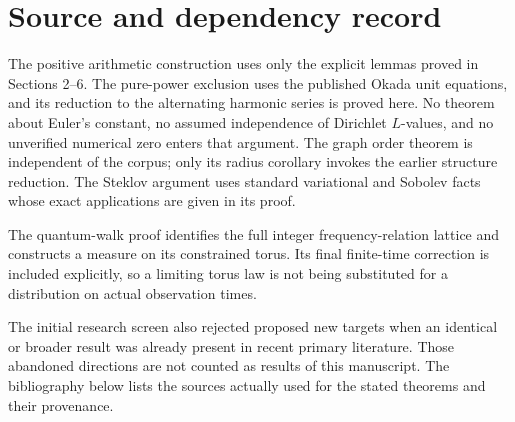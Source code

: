 \documentclass[11pt,a4paper]{article}
\theoremstyle{definition}\newtheorem{definition}[theorem]{Definition}
\theoremstyle{remark}\newtheorem{remark}[theorem]{Remark}
\begin{document}
\section{Source and dependency record}
The positive arithmetic construction uses only the explicit lemmas proved
in Sections 2--6. The pure-power exclusion uses the published Okada unit
equations, and its reduction to the alternating harmonic series is proved
here. No theorem about Euler's constant, no assumed independence of
Dirichlet $L$-values, and no unverified numerical zero enters that argument.
The graph order theorem is independent of the corpus; only its radius
corollary invokes the earlier structure reduction. The Steklov argument
uses standard variational and Sobolev facts whose exact applications
are given in its proof.

The quantum-walk proof identifies the full integer frequency-relation
lattice and constructs a measure on its constrained torus. Its final
finite-time correction is included explicitly, so a limiting torus law
is not being substituted for a distribution on actual observation times.

The initial research screen also rejected proposed new targets when an
identical or broader result was already present in recent primary
literature. Those abandoned directions are not counted as results of
this manuscript. The bibliography below lists the sources actually used
for the stated theorems and their provenance.
\end{document}
